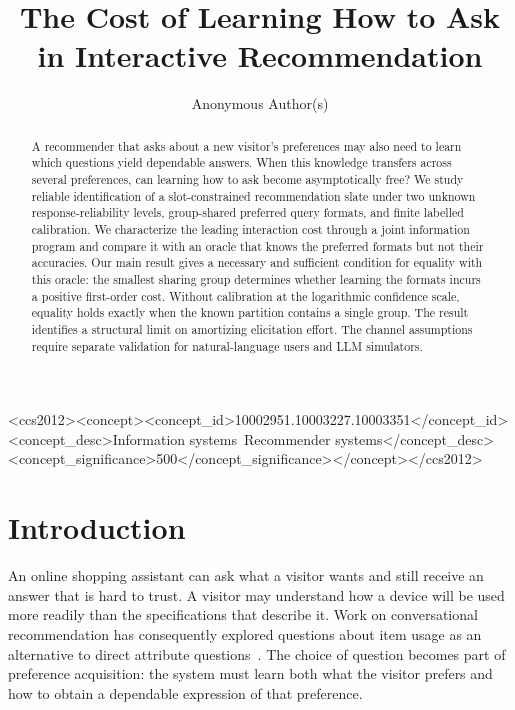 \documentclass[sigconf,anonymous,review]{acmart}
\title[Learning How to Ask in Recommendation]{The Cost of Learning How to Ask in Interactive Recommendation}
\author{Anonymous Author(s)}
\begin{document}
\begin{abstract}
A recommender that asks about a new visitor's preferences may also need to learn which questions yield dependable answers. When this knowledge transfers across several preferences, can learning how to ask become asymptotically free? We study reliable identification of a slot-constrained recommendation slate under two unknown response-reliability levels, group-shared preferred query formats, and finite labelled calibration. We characterize the leading interaction cost through a joint information program and compare it with an oracle that knows the preferred formats but not their accuracies. Our main result gives a necessary and sufficient condition for equality with this oracle: the smallest sharing group determines whether learning the formats incurs a positive first-order cost. Without calibration at the logarithmic confidence scale, equality holds exactly when the known partition contains a single group. The result identifies a structural limit on amortizing elicitation effort. The channel assumptions require separate validation for natural-language users and LLM simulators.
\end{abstract}
\begin{CCSXML}
<ccs2012><concept><concept_id>10002951.10003227.10003351</concept_id><concept_desc>Information systems~Recommender systems</concept_desc><concept_significance>500</concept_significance></concept></ccs2012>
\end{CCSXML}
\maketitle

\section{Introduction}
An online shopping assistant can ask what a visitor wants and still receive an answer that is hard to trust. A visitor may understand how a device will be used more readily than the specifications that describe it. Work on conversational recommendation has consequently explored questions about item usage as an alternative to direct attribute questions~\cite{kostric2021}. The choice of question becomes part of preference acquisition: the system must learn both what the visitor prefers and how to obtain a dependable expression of that preference.
\end{document}
